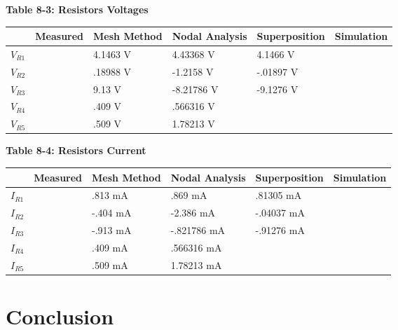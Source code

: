 \documentclass[a4paper]{article}
\begin{document}
\begin{center}
    \small\textbf{Table 8-3: Resistors Voltages \cite{UNCC-ECE-Dept:2023}}
    \begin{tabular}{|p{2 cm}|p{2cm}|p{2 cm}|p{2 cm}|p{2 cm}|p{2 cm}|}
        \hline
         & Measured & Mesh Method & Nodal Analysis & Superposition & Simulation \\
        \hline
        $V_{R1}$ & & 4.1463 V & 4.43368 V & 4.1466 V & \\
        \hline
        $V_{R2}$ & & .18988 V & -1.2158 V & -.01897 V & \\
        \hline
        $V_{R3}$ & & 9.13 V & -8.21786 V & -9.1276 V & \\
        \hline
        $V_{R4}$ & & .409 V & .566316 V & & \\
        \hline
        $V_{R5}$ & & .509 V & 1.78213 V & & \\
        \hline
    \end{tabular}
\end{center}

\begin{center}
    \small\textbf{Table 8-4: Resistors Current \cite{UNCC-ECE-Dept:2023}}
    \begin{tabular}{|p{2 cm}|p{2cm}|p{2 cm}|p{2 cm}|p{2 cm}|p{2 cm}|}
        \hline
         & Measured & Mesh Method & Nodal Analysis & Superposition & Simulation \\
        \hline
        $I_{R1}$ &  & .813 mA & .869 mA & .81305 mA & \\
        \hline
        $I_{R2}$ & & -.404 mA & -2.386 mA & -.04037 mA  & \\
        \hline
        $I_{R3}$ & & -.913 mA & -.821786 mA & -.91276 mA & \\
        \hline
        $I_{R4}$ & & .409 mA & .566316 mA & & \\
        \hline
        $I_{R5}$ & & .509 mA & 1.78213 mA & & \\
        \hline
    \end{tabular}
\end{center}

\section{Conclusion}





\end{document}
